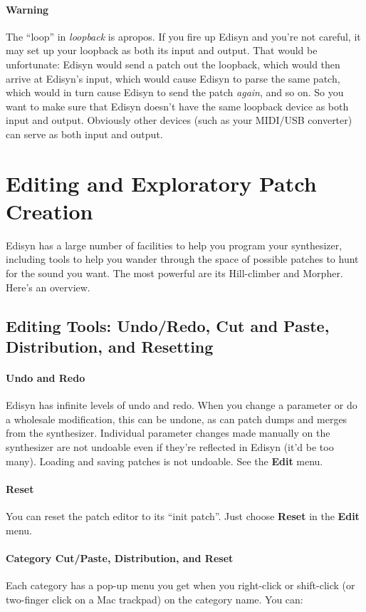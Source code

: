 \documentclass{article}
\begin{document}
\paragraph{Warning}  The ``loop'' in {\it loopback} is apropos.  If you fire up Edisyn and you're not careful, it may set up your loopback as both its input and output.  That would be unfortunate: Edisyn would send a patch out the loopback, which would then arrive at Edisyn's input, which would cause Edisyn to parse the same patch, which would in turn cause Edisyn to send the patch {\it again}, and so on.  So you want to make sure that Edisyn doesn't have the same loopback device as both input and output.  Obviously other devices (such as your MIDI/USB converter) can serve as both input and output.

\section{Editing and Exploratory Patch Creation}
\label{editing}

Edisyn has a large number of facilities to help you program your synthesizer, including tools to help you wander through the  space of possible patches to hunt for the sound you want.  The most powerful are its Hill-climber and Morpher.   Here's an overview.

\subsection{Editing Tools: Undo/Redo, Cut and Paste, Distribution, and Resetting} 

\paragraph{Undo and Redo}  Edisyn has infinite levels of undo and redo.  When you change a parameter or do a wholesale modification, this can be undone, as can patch dumps and merges from the synthesizer.  Individual parameter changes made manually on the synthesizer are not undoable even if they're reflected in Edisyn (it'd be too many).  Loading and saving patches is not undoable.  See the {\bf Edit} menu.

\paragraph{Reset}  You can reset the patch editor to its ``init patch''.  Just choose {\bf Reset} in the {\bf Edit} menu.

\paragraph{Category Cut/Paste, Distribution, and Reset}  Each category has a pop-up menu you get when you right-click or shift-click (or two-finger click on a Mac trackpad) on the category name. You can:
\end{document}
